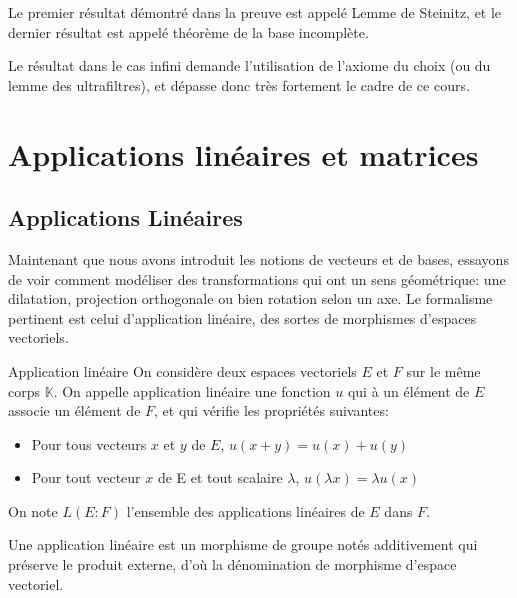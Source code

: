 \documentclass{classe}
\renewcommand*{\K}{\mathbb{K}}
\begin{document}
Le premier résultat démontré dans la preuve est appelé Lemme de Steinitz, et le dernier résultat est appelé théorème de la base incomplète.

Le résultat dans le cas infini demande l'utilisation de l'axiome du choix (ou du lemme des ultrafiltres), et dépasse donc très fortement le cadre de ce cours.

\section{Applications linéaires et matrices}
\subsection{Applications Linéaires}
Maintenant que nous avons introduit les notions de vecteurs et de bases, essayons de voir comment modéliser des transformations qui ont un sens géométrique: une dilatation, projection orthogonale ou bien rotation selon un axe.
Le formalisme pertinent est celui d'application linéaire, des sortes de morphismes d'espaces vectoriels.

\begin{définition}{Application linéaire}{}
On considère deux espaces vectoriels $E$ et $F$ sur le même corps $\K$.
On appelle application linéaire une fonction $u$ qui à un élément de $E$ associe un élément de $F$, et qui vérifie les propriétés suivantes:
\begin{itemize}
	\item Pour tous vecteurs $x$ et $y$ de $E$, $u(x+y) = u(x)+u(y)$
	\item Pour tout vecteur $x$ de E et tout scalaire $\lambda$, $u(\lambda x) = \lambda u(x)$
\end{itemize}
On note $L\left( E:F \right)$ l'ensemble des applications linéaires de $E$ dans $F$.
\end{définition}

Une application linéaire est un morphisme de groupe notés additivement qui préserve le produit externe, d'où la dénomination de morphisme d'espace vectoriel.
\end{document}
